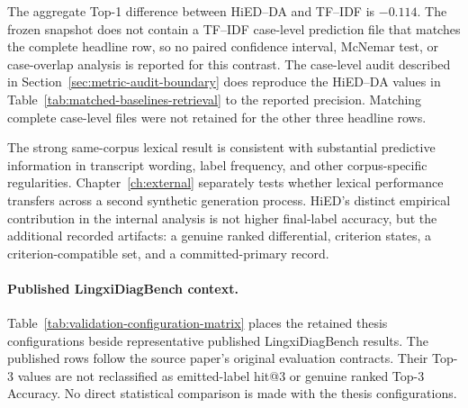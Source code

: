 The aggregate Top-1 difference between HiED--DA and TF--IDF is $-0.114$. The frozen snapshot does not contain a TF--IDF case-level prediction file that matches the complete headline row, so no paired confidence interval, McNemar test, or case-overlap analysis is reported for this contrast. The case-level audit described in Section~\ref{sec:metric-audit-boundary} does reproduce the HiED--DA values in Table~\ref{tab:matched-baselines-retrieval} to the reported precision. Matching complete case-level files were not retained for the other three headline rows.

The strong same-corpus lexical result is consistent with substantial predictive information in transcript wording, label frequency, and other corpus-specific regularities. Chapter~\ref{ch:external} separately tests whether lexical performance transfers across a second synthetic generation process. HiED's distinct empirical contribution in the internal analysis is not higher final-label accuracy, but the additional recorded artifacts: a genuine ranked differential, criterion states, a criterion-compatible set, and a committed-primary record.

\paragraph{Published LingxiDiagBench context.}
Table~\ref{tab:validation-configuration-matrix} places the retained thesis configurations beside representative published LingxiDiagBench results. The published rows follow the source paper's original evaluation contracts. Their Top-3 values are not reclassified as emitted-label hit@3 or genuine ranked Top-3 Accuracy. No direct statistical comparison is made with the thesis configurations.

